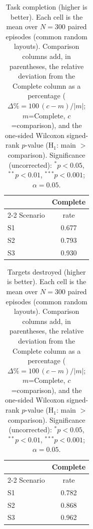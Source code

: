 
\begin{table}[ht]
  \centering
  \caption{Task completion (higher is better). Each cell is the mean over $N=300$ paired episodes (common random layouts). Comparison columns add, in parentheses, the relative deviation from the Complete column as a percentage ($\Delta\%=100\,(c-m)/|m|$; $m$=Complete, $c$=comparison), and the one-sided Wilcoxon signed-rank $p$-value (H$_1$: main $>$ comparison). Significance (uncorrected): $^{*}p<0.05$, $^{**}p<0.01$, $^{***}p<0.001$; $\alpha=0.05$.}
  \label{tab:wilcoxon-completion}
  \small
  \begin{tabular}{l c}
    \toprule
     & Complete \\
    \cmidrule(lr){2-2}
    Scenario & {rate} \\
    \midrule
    S1 & 0.677 \\
    S2 & 0.793 \\
    S3 & 0.930 \\
    \bottomrule
  \end{tabular}
\end{table}

\begin{table}[ht]
  \centering
  \caption{Targets destroyed (higher is better). Each cell is the mean over $N=300$ paired episodes (common random layouts). Comparison columns add, in parentheses, the relative deviation from the Complete column as a percentage ($\Delta\%=100\,(c-m)/|m|$; $m$=Complete, $c$=comparison), and the one-sided Wilcoxon signed-rank $p$-value (H$_1$: main $>$ comparison). Significance (uncorrected): $^{*}p<0.05$, $^{**}p<0.01$, $^{***}p<0.001$; $\alpha=0.05$.}
  \label{tab:wilcoxon-targets}
  \small
  \begin{tabular}{l c}
    \toprule
     & Complete \\
    \cmidrule(lr){2-2}
    Scenario & {rate} \\
    \midrule
    S1 & 0.782 \\
    S2 & 0.868 \\
    S3 & 0.962 \\
    \bottomrule
  \end{tabular}
\end{table}

